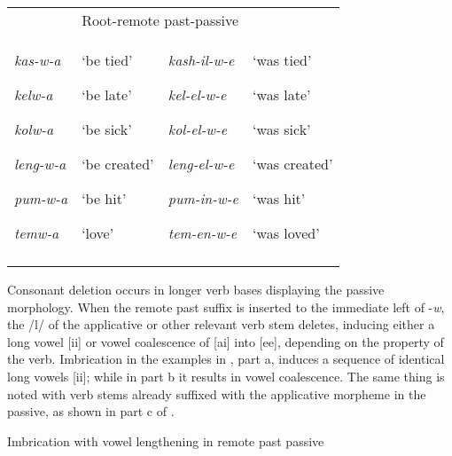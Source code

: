 \documentclass[output=paper]{langsci/langscibook}
\begin{document}
\begin{tabular}{llll}
\lsptoprule
\multicolumn{2}{l}{\mdseries Root-passive-FV} & \multicolumn{2}{l}{\mdseries Root-remote past-passive}\\
{\mdseries \emph{kas-w-a}}

{\mdseries \emph{kelw-a}}

{\mdseries \emph{kolw-a}}

{\mdseries \emph{leng-w-a}}

{\mdseries \emph{pum-w-a}}

\mdseries \emph{temw-a  } & {\mdseries ‘be tied’}

{\mdseries ‘be late’}

{\mdseries ‘be sick’}

{\mdseries ‘be created’}

{\mdseries ‘be hit’}

\mdseries ‘love’ & {\mdseries \emph{kash-il-w-e}}

{\mdseries \emph{kel-el-w-e}}

{\mdseries \emph{kol-el-w-e}}

{\mdseries \emph{leng-el-w-e}}

{\mdseries \emph{pum-in-w-e}}

\mdseries \emph{tem-en-w-e} & {\mdseries ‘was tied’}

{\mdseries ‘was late’}

{\mdseries ‘was sick’}

{\mdseries ‘was created’}

{\mdseries ‘was hit’}

\mdseries ‘was loved’\\
\lspbottomrule
\end{tabular}
Consonant deletion occurs in longer verb bases displaying the passive morphology. When the remote past suffix is inserted to the immediate left of -\textit{w}, the /l/ of the applicative or other relevant verb stem deletes, inducing either a long vowel [ii] or vowel coalescence of [ai] into [ee], depending on the property of the verb. Imbrication in the examples in , part a, induces a sequence of identical long vowels [ii]; while in part b it results in vowel coalescence. The same thing is noted with verb stems already suffixed with the applicative morpheme in the passive, as shown in part c of .

\begin{stylelsTableHeading}%
\begin{table}
\caption{Imbrication with vowel lengthening in remote past passive}
\label{tab:26}
\end{table}\end{stylelsTableHeading}
\end{document}
